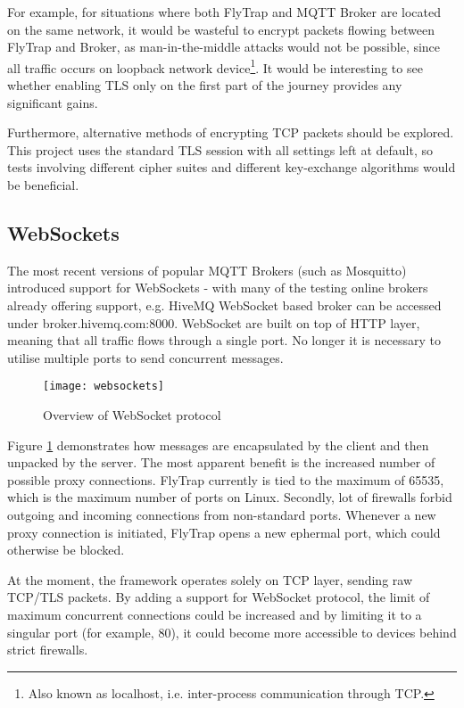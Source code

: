 For example, for situations where both FlyTrap and MQTT Broker are located on the same network, it would be wasteful to encrypt packets flowing between FlyTrap and Broker, as man-in-the-middle attacks would not be possible, since all traffic occurs on loopback network device\footnote{Also known as localhost, i.e. inter-process communication through TCP.}. It would be interesting to see whether enabling TLS only on the first part of the journey provides any significant gains.

Furthermore, alternative methods of encrypting TCP packets should be explored. This project uses the standard TLS session with all settings left at default, so tests involving different cipher suites and different key-exchange algorithms would be beneficial.
\subsection{WebSockets}
The most recent versions of popular MQTT Brokers (such as Mosquitto) introduced support for WebSockets - with many of the testing online brokers already offering support, e.g. HiveMQ WebSocket based broker can be accessed under broker.hivemq.com:8000. WebSocket \cite{fette2011websocket} are built on top of HTTP layer, meaning that all traffic flows through a single port. No longer it is necessary to utilise multiple ports to send concurrent messages.

\begin{figure}[h]
    \centering
    \texttt{[image: websockets]}
    \caption{Overview of WebSocket protocol}
    \label{fig:websockets}
\end{figure}

Figure \ref{fig:websockets} demonstrates how messages are encapsulated by the client and then unpacked by the server. The most apparent benefit is the increased number of possible proxy connections. FlyTrap currently is tied to the maximum of 65535, which is the maximum number of ports on Linux. Secondly, lot of firewalls forbid outgoing and incoming connections from non-standard ports. Whenever a new proxy connection is initiated, FlyTrap opens a new ephermal port, which could otherwise be blocked.

At the moment, the framework operates solely on TCP layer, sending raw TCP/TLS packets. By adding a support for WebSocket protocol, the limit of maximum concurrent connections could be increased and by limiting it to a singular port (for example, 80), it could become more accessible to devices behind strict firewalls.
